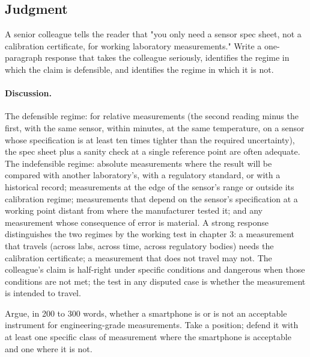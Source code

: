 \subsection*{Judgment}

\begin{exercise}
A senior colleague tells the reader that "you only need a sensor
spec sheet, not a calibration certificate, for working
laboratory measurements." Write a one-paragraph response that takes
the colleague seriously, identifies the regime in which the claim
is defensible, and identifies the regime in which it is not.
\end{exercise}

\paragraph{Discussion.} The defensible regime: for relative
measurements (the second reading minus the first, with the same
sensor, within minutes, at the same temperature, on a sensor whose
specification is at least ten times tighter than the required
uncertainty), the spec sheet plus a sanity check at a single
reference point are often adequate. The indefensible regime:
absolute measurements where the result will be compared with
another laboratory's, with a regulatory standard, or with a
historical record; measurements at the edge of the sensor's range
or outside its calibration regime; measurements that depend on the
sensor's specification at a working point distant from where the
manufacturer tested it; and any measurement whose consequence of
error is material. A strong response distinguishes the two regimes
by the working test in chapter 3: a measurement that travels
(across labs, across time, across regulatory bodies) needs the
calibration certificate; a measurement that does not travel may
not. The colleague's claim is half-right under specific
conditions and dangerous when those conditions are not met; the
test in any disputed case is whether the measurement is intended to
travel.

\begin{exercise}
Argue, in 200 to 300 words, whether a smartphone is or is not an
acceptable instrument for engineering-grade measurements. Take a
position; defend it with at least one specific class of measurement
where the smartphone is acceptable and one where it is not.
\end{exercise}

